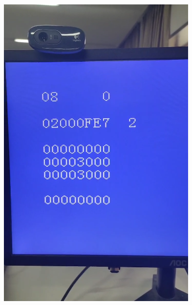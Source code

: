 \documentclass[12pt,hyperref,a4paper,UTF8]{ctexart}
\begin{document}
\begin{figure}[H]
    \centering
    \begin{minipage}[b]{0.24\textwidth}
        \centering
        \includegraphics[width=\textwidth]{figures/fig/fram1.png}
    \end{minipage}
    \begin{minipage}[b]{0.24\textwidth}
        \centering

\end{minipage}
\end{figure}
\end{document}
